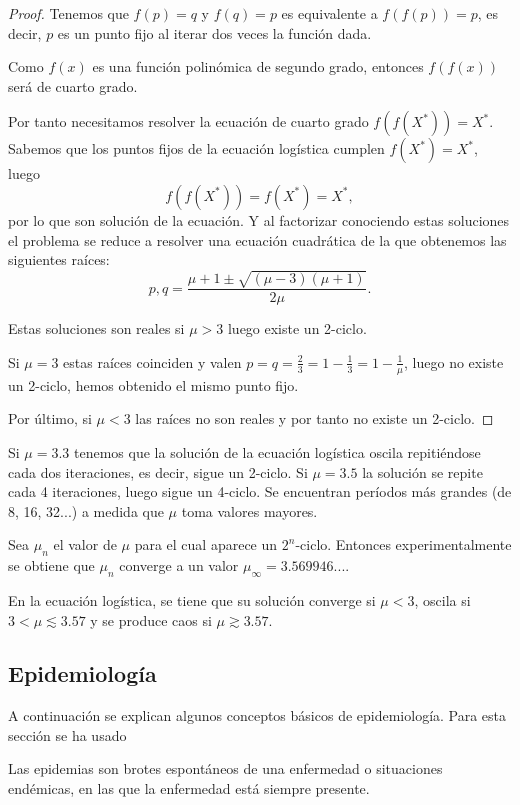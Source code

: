 \begin{proof}
Tenemos que $f(p)=q$ y $f(q)=p$ es equivalente a $f(f(p))=p$, es decir, $p$ es un punto fijo al iterar dos veces la función dada.

Como $f(x)$ es una función polinómica de segundo grado, entonces $f(f(x))$ será de cuarto grado.

Por tanto necesitamos resolver la ecuación de cuarto grado $f(f(X^*))=X^*$. Sabemos que los puntos fijos de la ecuación logística cumplen $f(X^*)=X^*$, luego
$$f(f(X^*))=f(X^*)=X^*,$$
por lo que son solución de la ecuación. Y al factorizar conociendo estas soluciones el problema se reduce a resolver una ecuación cuadrática de la que obtenemos las siguientes raíces:
$$p,q=\frac{\mu+1\pm \sqrt{(\mu -3)(\mu +1)}}{2\mu}.$$

Estas soluciones son reales si $\mu > 3$ luego existe un 2-ciclo.

Si $\mu = 3$ estas raíces coinciden y valen $p=q=\frac{2}{3}=1-\frac{1}{3}=1-\frac{1}{\mu }$, luego no existe un 2-ciclo, hemos obtenido el mismo punto fijo.

Por último, si $\mu < 3$ las raíces no son reales y por tanto no existe un 2-ciclo.
\end{proof}

Si $\mu = 3.3$ tenemos  que la solución de la ecuación logística oscila repitiéndose cada dos iteraciones, es decir, sigue un 2-ciclo. Si $\mu = 3.5$ la solución se repite cada 4 iteraciones, luego sigue un 4-ciclo.
Se encuentran períodos más grandes (de 8, 16, 32...) a medida que $\mu$ toma valores mayores.

Sea $\mu_n$ el valor de $\mu$ para el cual aparece un $2^n$-ciclo. Entonces experimentalmente se obtiene que $\mu_n$ converge a un valor $\mu_\infty=3.569946...$.


\begin{proposition}
En la ecuación logística, se tiene que su solución converge si $\mu < 3$, oscila si $3 < \mu \lesssim 3.57$ y se produce caos si $\mu \gtrsim 3.57$. 
\end{proposition}


\subsection{Epidemiología}

A continuación se explican algunos conceptos básicos de epidemiología. Para esta sección se ha usado \cite{brauerMathematicalModelsPopulation2012}

\begin{definition}
Las epidemias son brotes espontáneos de una enfermedad o situaciones endémicas, en las que la enfermedad está siempre presente.
\end{definition}

